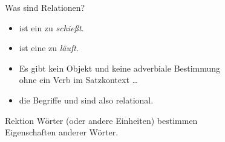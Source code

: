 \begin{frame}
  {Was sind Relationen?}
  \onslide<+->
  \onslide<+->
  \begin{exe}
    \ex\label{ex:rektionundkongruenz024}
    \begin{xlist}
    \end{xlist}
  \end{exe}
  \onslide<+->
  \Zeile
  \begin{itemize}[<+->]
    \item {} ist ein  zu \textit{schießt}.
    \item {} ist eine  zu \textit{läuft}.
      \Zeile
    \item Es gibt kein Objekt und keine adverbiale Bestimmung\\
      ohne ein Verb im Satzkontext \ldots
    \item die Begriffe  und  sind also \alert{relational}.
  \end{itemize}
\end{frame}

\begin{frame}
  \onslide<+->
  \onslide<+->
  {Rektion}
  Wörter (oder andere Einheiten) \alert{bestimmen}\\
  Eigenschaften anderer Wörter.\\
  \onslide<+->
  \Zeile
  \begin{exe}
  \end{exe}
  \onslide<+->
  \Halbzeile
  \begin{exe}
    \ex
    \begin{xlist}
    \end{xlist}
  \end{exe}
\end{frame}

